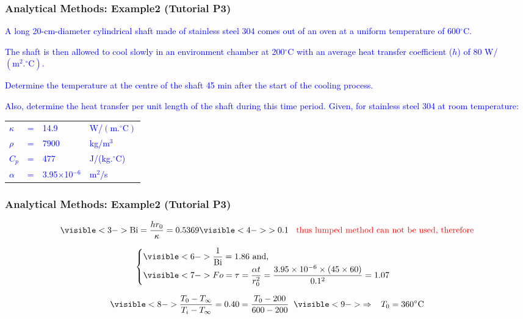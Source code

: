 \documentclass[10pt,compress,unknownkeysallowed]{beamer}
\newcommand{\frc}{\displaystyle\frac}
\newcommand{\red}{\textcolor{red}}
\newcommand{\blue}{\textcolor{blue}}
\newcommand{\dimensionless}[1]{\mathrm{#1}}
\newcommand{\Bi}{\dimensionless{Bi}}
\begin{document}
\begin{frame}
 \frametitle{Analytical Methods: Example2 (Tutorial P3)}
\blue{A long 20-cm-diameter cylindrical shaft made of stainless steel 304 comes out of an oven at a uniform temperature of 600$^{\circ}$C. }
\medskip

\blue{The shaft is then allowed to cool slowly in an environment chamber at 200$^{\circ}$C with an average heat transfer coefficient ($h$) of 80 W/$\left(\text{m}^{2}.^{\circ}\text{C}\right)$.}
\medskip

\blue{Determine the temperature at the centre of the shaft 45 min after the start of the cooling process. }
\medskip

\blue{Also, determine the heat transfer per unit length of the shaft during this time period. Given, for stainless steel 304 at room temperature:} \\
\begin{tabular}{l c l l}
\blue{$\kappa$} & \blue{=} & \blue{14.9} & \blue{W/$\left(\text{m.}^{\circ}\text{C}\right)$} \\
\blue{$\rho$}   & \blue{=} & \blue{7900} & \blue{kg/m$^{3}$} \\
\blue{$C_{p}$}   & \blue{=} & \blue{477} & \blue{J/(kg.$^{\circ}$C)} \\
\blue{$\alpha$} & \blue{=} & \blue{3.95$\times$10$^{-6}$} & \blue{m$^{2}$/s} 
\end{tabular}



\end{frame}


\begin{frame}
 \frametitle{Analytical Methods: Example2 (Tutorial P3)}

    \begin{displaymath}
       \visible<3->{\Bi = \frc{hr_{0}}{\kappa} = 0.5369}\visible<4->{>0.1\;\; \red{\text{ thus lumped method can not be used, therefore}}}
    \end{displaymath}
\medskip

    \begin{displaymath}
        \begin{cases}
            \visible<6->{\frc{1}{\Bi} = 1.86\text{ and, }} \\
            \visible<7->{Fo = \tau = \frc{\alpha t}{r_{0}^{2}} = \frc{3.95\times 10^{-6} \times \left(45 \times 60\right)}{0.1^{2}} = 1.07}  
        \end{cases}
    \end{displaymath}

    \begin{displaymath}
         \visible<8->{\frc{T_{0}-T_{\infty}}{T_{i}-T_{\infty}} = 0.40 = \frc{T_{0}-200}{600-200}}\;\;\visible<9->{\Rightarrow\;\;\;T_{0}=360^{\circ}\text{C}}
    \end{displaymath}

\end{frame}
\end{document}
